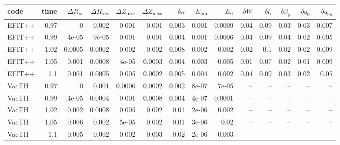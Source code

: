 \begin{table}
\centering

\begin{tabular}{lrrrrrrrrrrrrr}
\toprule
   code &  time &  $\Delta R_{\mathrm in}$ &  $\Delta R_{\mathrm out}$ &  $\Delta Z_{\mathrm min}$ &  $\Delta Z_{\mathrm max}$ &  $\delta \kappa$ &  $E_\mathrm{mp}$ &  $E_\mathrm{fl}$ &  $\delta W$ &  $\delta l_{\mathrm i}$ &  $\delta \beta_{\mathrm p}$ &  $\delta q_0$ &  $\delta q_{95}$ \\
\midrule
 EFIT++ &  0.97 &              0 &            0.002 &        0.001 &        0.001 &                  0.003 &       0.001 &      0.0009 &          0.04 &           0.09 &              0.03 &           0.03 &           0.007 \\
 EFIT++ &  0.99 &          4e-05 &            9e-05 &        0.001 &        0.001 &                  0.004 &       0.001 &      0.0006 &          0.04 &           0.09 &              0.04 &           0.02 &           0.005 \\
 EFIT++ &  1.02 &         0.0005 &           0.0002 &        0.002 &        0.002 &                  0.008 &       0.002 &       0.002 &          0.02 &            0.1 &              0.02 &           0.02 &           0.009 \\
 EFIT++ &  1.05 &          0.001 &           0.0008 &        4e-05 &       0.0003 &                  0.004 &       0.003 &       0.005 &          0.01 &           0.07 &              0.02 &           0.01 &           0.009 \\
 EFIT++ &   1.1 &          0.001 &           0.0005 &        0.005 &       0.0002 &                  0.005 &       0.004 &       0.002 &          0.04 &           0.09 &              0.03 &           0.02 &            0.05 \\
  VacTH &  0.97 &              0 &            0.001 &       0.0006 &       0.0002 &                  0.002 &       8e-07 &       7e-05 &           -- &            -- &               -- &            -- &             -- \\
  VacTH &  0.99 &          4e-05 &           0.0004 &        0.001 &       0.0008 &                  0.004 &       4e-07 &      0.0001 &           -- &            -- &               -- &            -- &             -- \\
  VacTH &  1.02 &          0.002 &           0.0008 &        0.005 &        0.002 &                   0.01 &       2e-06 &       0.002 &           -- &            -- &               -- &            -- &             -- \\
  VacTH &  1.05 &          0.006 &            0.002 &        5e-05 &        0.002 &                   0.01 &       3e-06 &        0.02 &           -- &            -- &               -- &            -- &             -- \\
  VacTH &   1.1 &          0.005 &            0.002 &        0.002 &        0.003 &                   0.02 &       2e-06 &       0.003 &           -- &            -- &               -- &            -- &             -- \\
\bottomrule
\end{tabular}


\end{table}
